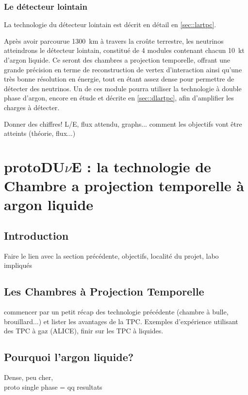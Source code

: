 	         \subsubsection{Le détecteur lointain}\label{sec::far_detector}
	         
	         La technologie du détecteur lointain est décrit en détail en \autoref{sec::lartpc}.
	         
	         Après avoir parcourue \SI{1300}{\kilo\meter} à travers la croûte terrestre, les neutrinos atteindrons le détecteur lointain, constitué de 4 modules contenant chacun \SI{10}{\kilo\tonne} d'argon liquide. Ce seront des chambres a projection temporelle, offrant une grande précision en terme de reconstruction de vertex d'interaction ainsi qu'une très bonne résolution en énergie, tout en étant assez dense pour permettre de détecter des neutrinos. Un de ces module pourra utiliser la technologie à double phase d'argon, encore en étude et décrite en \autoref{sec::dlartpc}, afin d'amplifier les charges à détecter.
	         
	         Donner des chiffres! L/E, flux attendu, graphs...
	         comment les objectifs vont être atteints (théorie, flux...)
    
    \section{\texorpdfstring{protoDU$\nu$E}{protoDUNE} : la technologie de Chambre a projection temporelle à argon liquide}\label{sec::lartpc}
    
        \subsection{Introduction}
            Faire le lien avec la section précédente, objectifs, localité du projet, labo impliqués
    
        \subsection{Les Chambres à Projection Temporelle}
            commencer par un petit récap des technologie précédente (chambre à bulle, brouillard...) et lister les avantages de la TPC. Exemples d'expérience utilisant des TPC à gaz (ALICE), finir sur les TPC à liquides.
        
        \subsection{Pourquoi l'argon liquide?}
            Dense, peu cher, \\
            proto single phase = qq resultats
        
